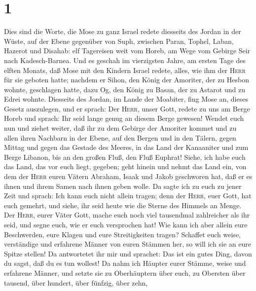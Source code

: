 \hypertarget{section}{%
\section{1}\label{section}}

 Dies sind die Worte, die Mose zu ganz Israel redete
diesseits des Jordan in der Wüste, auf der Ebene gegenüber von Suph,
zwischen Paran, Tophel, Laban, Hazerot und Disahab:  elf
Tagereisen weit vom Horeb, am Wege vom Gebirge Seir nach Kadesch-Barnea.
 Und es geschah im vierzigsten Jahre, am ersten Tage des
elften Monats, daß Mose mit den Kindern Israel redete, alles, wie ihm
der \textsc{Herr} für sie geboten hatte;  nachdem er
Sihon, den König der Amoriter, der zu Hesbon wohnte, geschlagen hatte,
dazu Og, den König zu Basan, der zu Astarot und zu Edrei wohnte.
 Diesseits des Jordan, im Lande der Moabiter, fing Mose
an, dieses Gesetz auszulegen, und er sprach:  Der
\textsc{Herr}, unser Gott, redete zu uns am Berge Horeb und sprach: Ihr
seid lange genug an diesem Berge gewesen!  Wendet euch nun
und ziehet weiter, daß ihr zu dem Gebirge der Amoriter kommet und zu
allen ihren Nachbarn in der Ebene, auf den Bergen und in den Tälern,
gegen Mittag und gegen das Gestade des Meeres, in das Land der
Kanaaniter und zum Berge Libanon, bis an den großen Fluß, den Fluß
Euphrat!  Siehe, ich habe euch das Land, das vor euch
liegt, gegeben; geht hinein und nehmt das Land ein, von dem der
\textsc{Herr} euren Vätern Abraham, Isaak und Jakob geschworen hat, daß
er es ihnen und ihrem Samen nach ihnen geben wolle.  Da
sagte ich zu euch zu jener Zeit und sprach: Ich kann euch nicht allein
tragen;  denn der \textsc{Herr}, euer Gott, hat euch
gemehrt, und siehe, ihr seid heute wie die Sterne des Himmels an Menge.
 Der \textsc{Herr}, eurer Väter Gott, mache euch noch
viel tausendmal zahlreicher als ihr seid, und segne euch, wie er euch
versprochen hat!  Wie kann ich aber allein eure
Beschwerden, eure Klagen und eure Streitigkeiten tragen? 
Schaffet euch weise, verständige und erfahrene Männer von euren Stämmen
her, so will ich sie an eure Spitze stellen!  Da
antwortetet ihr mir und sprachet: Das ist ein gutes Ding, davon du
sagst, daß du es tun wollest!  Da nahm ich Häupter eurer
Stämme, weise und erfahrene Männer, und setzte sie zu Oberhäuptern über
euch, zu Obersten über tausend, über hundert, über fünfzig, über zehn,
